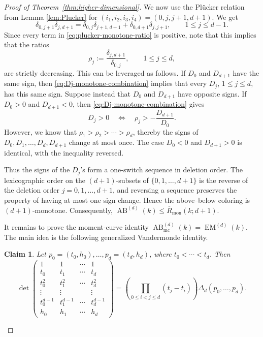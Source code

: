 \documentclass[10pt,a4paper]{amsart}
\newtheorem{claim}{Claim}
\begin{document}
\begin{proof}[Proof of Theorem~\ref{thm:higher-dimensional}]
We now use the Pl\"ucker relation from Lemma \ref{lem:Plucker} for $(i_1,i_2,i_3,i_4)=(0,j,j+1,d+1)$. We get
\begin{equation}\label{eq:plucker-monotone-ratio}
\delta_{0,j+1}\delta_{j,d+1}
=
\delta_{0,j}\delta_{j+1,d+1}
+
\delta_{0,d+1}\delta_{j,j+1},
\qquad 1\le j\le d-1.
\end{equation}
Since every term in \eqref{eq:plucker-monotone-ratio} is positive, note that this implies that the ratios
\[
\rho_j:=\frac{\delta_{j,d+1}}{\delta_{0,j}},
\qquad 1\le j\le d,
\]
are strictly decreasing. This can be leveraged as follows. If $D_0$ and $D_{d+1}$ have the same sign, then
\eqref{eq:Dj-monotone-combination} implies that every $D_j$, $1\le j\le d$,
has this same sign. Suppose instead that $D_0$ and $D_{d+1}$ have opposite
signs. If $D_0>0$ and $D_{d+1}<0$, then
\eqref{eq:Dj-monotone-combination} gives
\[
D_j>0
\quad\Longleftrightarrow\quad
\rho_j>-\frac{D_{d+1}}{D_0}.
\]
However, we know that $\rho_1>\rho_2>\cdots>\rho_d$, thereby the signs of $D_0,D_1,\ldots,D_d,D_{d+1}$ change at most once. The case $D_0<0$ and $D_{d+1}>0$ is identical, with the
inequality reversed.

Thus the signs of the $D_j$'s form a one-switch sequence in deletion order.
The lexicographic order on the $(d+1)$-subsets of
$\{0,1,\ldots,d+1\}$ is the reverse of the deletion order
$j=0,1,\ldots,d+1$, and reversing a sequence preserves the property of having
at most one sign change. Hence the above--below coloring is
$(d+1)$-monotone. Consequently, $\operatorname{AB}^{(d)}(k)\le \overline R_{\mathrm{mon}}(k;d+1)$.

It remains to prove the moment-curve identity $\operatorname{AB}^{(d)}_{\mathrm{mc}}(k)=\operatorname{EM}^{(d)}(k)$. The main idea is the following generalized Vandermonde identity.

\begin{claim}\label{claim:vandermonde-divdiff}
Let $p_0=(t_0,h_0),\dots,p_d=(t_d,h_d)$, where $t_0<\cdots<t_d$. Then
\[
\det
\begin{pmatrix}
1&1&\cdots&1\\
t_0&t_1&\cdots&t_d\\
t_0^2&t_1^2&\cdots&t_d^2\\
\vdots&\vdots&&\vdots\\
t_0^{d-1}&t_1^{d-1}&\cdots&t_d^{d-1}\\
h_0&h_1&\cdots&h_d
\end{pmatrix}
=
\left(\prod_{0\le i<j\le d}(t_j-t_i)\right)
\Delta_d(p_0,\dots,p_d).
\]
\end{claim}


\end{proof}
\end{document}
